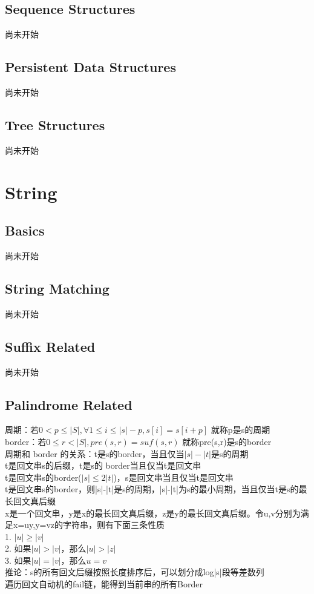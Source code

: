 \documentclass[10pt]{ctexart}
\begin{document}
{\subsection{Sequence Structures}
尚未开始
\subsection{Persistent Data Structures}
尚未开始
\subsection{Tree Structures}
尚未开始


\newpage
\section{String}
\subsection{Basics}
尚未开始
\subsection{String Matching}
尚未开始
\subsection{Suffix Related}
尚未开始
\subsection{Palindrome Related}
周期：若$0 < p \leq |S|, {\forall}1 \leq i \leq{|s|-p}, s[i] = s[i+p]$ 就称p是s的周期\\
border：若$0 \leq r < |S|, pre(s, r) = suf(s,r)$ 就称pre(s,r)是s的border\\
周期和 border 的关系：t是s的border，当且仅当$|s| - |t|$是s的周期\\
t是回文串s的后缀，t是s的 border当且仅当t是回文串\\
t是回文串s的border($|s|\leq 2|t|$)，s是回文串当且仅当t是回文串\\
t是回文串s的border，则|s|-|t|是s的周期，|s|-|t|为s的最小周期，当且仅当t是s的最长回文真后缀\\
x是一个回文串，y是x的最长回文真后缀，z是y的最长回文真后缀。令u,v分别为满足x=uy,y=vz的字符串，则有下面三条性质\\
1. $|u| \geq |v|$\\
2. 如果$|u| > |v|$，那么$ |u| > |z|$\\
3. 如果$|u| = |v|$，那么$ u = v$\\
推论：s的所有回文后缀按照长度排序后，可以划分成log|s|段等差数列\\
遍历回文自动机的fail链，能得到当前串的所有Border\\

}
\end{document}
